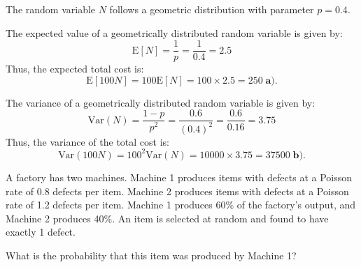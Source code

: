 \documentclass[a4paper, 10pt]{article}
\begin{document}
\begin{solution}
	The random variable \( N \) follows a geometric distribution with parameter \( p = 0.4 \).

	The expected value of a geometrically distributed random variable is given by:
	\[
		\text{E}[N] = \frac{1}{p} = \frac{1}{0.4} = 2.5
	\]
	Thus, the expected total cost is:
	\[
		\text{E}[100N] = 100\text{E}[N] = 100 \times 2.5 = \boxed{250} \; \textbf{a).}
	\]

	The variance of a geometrically distributed random variable is given by:
	\[
		\text{Var}(N) = \frac{1-p}{p^2} = \frac{0.6}{(0.4)^2} = \frac{0.6}{0.16} = 3.75
	\]
	Thus, the variance of the total cost is:
	\[
		\text{Var}(100N) = 100^2 \text{Var}(N) = 10000 \times 3.75 = \boxed{37500} \; \textbf{b).}
	\]
\end{solution}

\begin{problem}
A factory has two machines. Machine 1 produces items with defects at a Poisson rate of 0.8 defects per item.
Machine 2 produces items with defects at a Poisson rate of 1.2 defects per item.
Machine 1 produces 60\% of the factory's output, and Machine 2 produces 40\%.
An item is selected at random and found to have exactly 1 defect.
\begin{subproblems_alpha}
	\item What is the probability that this item was produced by Machine 1?
\end{subproblems_alpha}
\end{problem}
\end{document}
